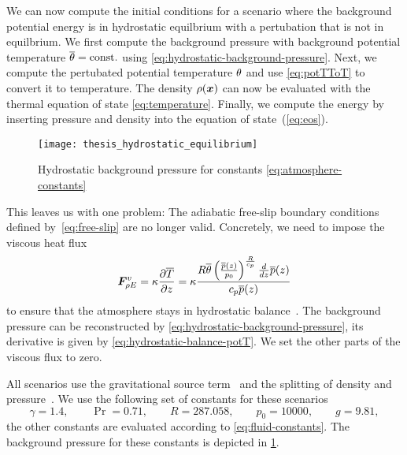We can now compute the initial conditions for a scenario where the background potential energy is in hydrostatic equilbrium with a pertubation that is not in equilbrium.
We first compute the background pressure with background potential temperature $\overline{\theta} = \text{const.}$ using \cref{eq:hydrostatic-background-pressure}.
Next, we compute the pertubated potential temperature $\theta$ and use \cref{eq:potTToT} to convert it to temperature.
The density $\rho(\bm{x})$ can now be evaluated with the thermal equation of state \cref{eq:temperature}.
Finally, we compute the energy by inserting pressure and density into the equation of state~(\ref{eq:eos}).

\begin{figure}[tb]
  \centering
  \texttt{[image: thesis\_hydrostatic\_equilibrium]}
  \caption{\label{fig:hydrostatic-p}%
    Hydrostatic background pressure for constants \cref{eq:atmosphere-constants}}
\end{figure}

This leaves us with one problem:
The adiabatic free-slip boundary conditions defined by~\cref{eq:free-slip} are no longer valid.
Concretely, we need to impose the viscous heat flux
\begin{equation}
  \label{eq:atmosphere-bc}
  \bm{F}^{v}_{\rho E} = \kappa \pdv{\overline{T}}{z} =
\kappa \frac{R \overline{\theta} \left(\frac{\overline{p}{\left (z \right )}}{p_{0}}\right)^{\frac{R}{c_{p}}} \frac{d}{d z} \overline{p}{\left (z \right )}}{c_{p} \overline{p}{\left (z \right )}}
\end{equation}
to ensure that the atmosphere stays in hydrostatic balance~\cite{giraldo2008study}.
The background pressure can be reconstructed by \cref{eq:hydrostatic-background-pressure}, its derivative is given by \cref{eq:hydrostatic-balance-potT}.
We set the other parts of the viscous flux to zero.

All scenarios use the gravitational source term~ and the splitting of density and pressure~.
We use the following set of constants for these scenarios
\begin{equation}\label{eq:atmosphere-constants}
    \gamma = 1.4 ,\qquad \Pr =  0.71 ,\qquad R = 287.058 ,\qquad p_0 = 10000, \qquad g = 9.81,
\end{equation}
the other constants are evaluated according to \cref{eq:fluid-constants}.
The background pressure for these constants is depicted in \cref{fig:hydrostatic-p}.

